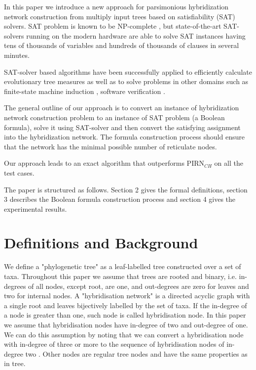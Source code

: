 \documentclass[runningheads, envcountsame, a4paper]{llncs}
\begin{document}
In this paper we introduce a new approach for parsimonious
hybridization network construction from multiply input trees based on satisfiability (SAT) solvers.
SAT problem is known to be NP-complete \cite{bordewich2007computing}, but state-of-the-art SAT-solvers running on the modern hardware 
are able to solve SAT instances having tens of thousands of variables and hundreds of thousands of clauses in several minutes.

SAT-solver based algorithms have been successfully applied to efficiently calculate evolutionary tree measures \cite{bonet2009efficiently}
as well as to solve problems in other domains such as
finite-state machine induction \cite{heule2010exact}, software verification \cite{}.

The general outline of our approach is to convert an instance of hybridization network construction 
problem to an instance of SAT problem (a Boolean formula), solve it using SAT-solver and then convert 
the satisfying assignment into the hybridization network. The formula construction process should ensure that
the network has the minimal possible number of reticulate nodes.

Our approach leads to an exact algorithm that outperforms PIRN$_{CH}$ on all the test cases.

The paper is structured as follows. Section 2 gives the formal definitions, section 3 describes the Boolean formula
construction process and section 4 gives the experimental results.

\section{Definitions and Background}

We define a "phylogenetic tree" as a leaf-labelled tree constructed over a set of taxa. 
Throughout this paper we assume that trees are rooted and binary, i.e. in-degrees of all nodes, except root, are one, 
and out-degrees are zero for leaves and two for internal nodes. A "hybridisation network" is a directed acyclic graph 
with a single root and leaves bijectively labelled by the set of taxa. If the in-degree of a node is greater than one, 
such node is called hybridisation node. In this paper we assume that hybridisation nodes have in-degree of two and 
out-degree of one. We can do this assumption by noting that we can convert a hybridisation node with in-degree 
of three or more to the sequence of hybridisation nodes of in-degree two \cite{wu2010close}. Other nodes are regular 
tree nodes and have the same properties as in tree.
\end{document}
